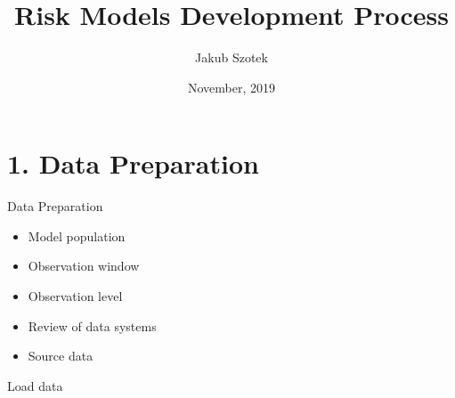 \documentclass[9pt,ignorenonframetext,]{beamer}
\title{Risk Models Development Process}
\author{Jakub Szotek}
\date{November, 2019}
\newenvironment{Shaded}{\begin{snugshade}}{\end{snugshade}}
\newcommand{\KeywordTok}[1]{\textcolor[rgb]{0.13,0.29,0.53}{\textbf{#1}}}
\newcommand{\StringTok}[1]{\textcolor[rgb]{0.31,0.60,0.02}{#1}}
\newcommand{\NormalTok}[1]{#1}
\providecommand{\tightlist}{%
  \setlength{\itemsep}{0pt}\setlength{\parskip}{0pt}}
\begin{document}
\frame{\titlepage}

\begin{frame}
\tableofcontents[hideallsubsections]
\end{frame}

\section{1. Data Preparation}\label{data-preparation}

\begin{frame}{Data Preparation}

\begin{itemize}
\tightlist
\item
  Model population
\item
  Observation window
\item
  Observation level
\item
  Review of data systems
\item
  Source data
\end{itemize}

\end{frame}

\begin{frame}[fragile]{Load data}

\begin{Shaded}
\end{Shaded}

\end{frame}
\end{document}
